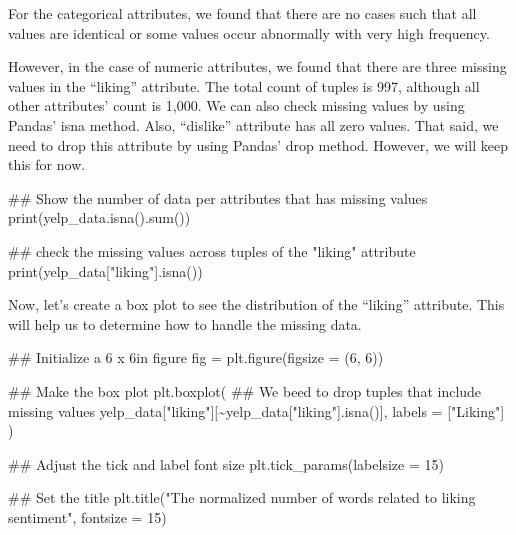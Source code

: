 \documentclass[
  letterpaper,
]{scrbook}
\newenvironment{Shaded}{\begin{snugshade}}{\end{snugshade}}
\newcommand{\BuiltInTok}[1]{\textcolor[rgb]{0.00,0.23,0.31}{#1}}
\newcommand{\CommentTok}[1]{\textcolor[rgb]{0.37,0.37,0.37}{#1}}
\newcommand{\DecValTok}[1]{\textcolor[rgb]{0.68,0.00,0.00}{#1}}
\newcommand{\NormalTok}[1]{\textcolor[rgb]{0.00,0.23,0.31}{#1}}
\newcommand{\OperatorTok}[1]{\textcolor[rgb]{0.37,0.37,0.37}{#1}}
\newcommand{\StringTok}[1]{\textcolor[rgb]{0.13,0.47,0.30}{#1}}
\begin{document}
For the categorical attributes, we found that there are no cases such
that all values are identical or some values occur abnormally with very
high frequency.

However, in the case of numeric attributes, we found that there are
three missing values in the ``liking'' attribute. The total count of
tuples is 997, although all other attributes' count is 1,000. We can
also check missing values by using Pandas' isna method. Also,
``dislike'' attribute has all zero values. That said, we need to drop
this attribute by using Pandas' drop method. However, we will keep this
for now.

\begin{Shaded}
\begin{Highlighting}[]
\CommentTok{\#\# Show the number of data per attributes that has missing values}
\BuiltInTok{print}\NormalTok{(yelp\_data.isna().}\BuiltInTok{sum}\NormalTok{())}
\end{Highlighting}
\end{Shaded}

\begin{Shaded}
\begin{Highlighting}[]
\CommentTok{\#\# check the missing values across tuples of the "liking" attribute}
\BuiltInTok{print}\NormalTok{(yelp\_data[}\StringTok{"liking"}\NormalTok{].isna())}
\end{Highlighting}
\end{Shaded}

Now, let's create a box plot to see the distribution of the ``liking''
attribute. This will help us to determine how to handle the missing
data.

\begin{Shaded}
\begin{Highlighting}[]
\CommentTok{\#\# Initialize a 6 x 6in figure}
\NormalTok{fig }\OperatorTok{=}\NormalTok{ plt.figure(figsize }\OperatorTok{=}\NormalTok{ (}\DecValTok{6}\NormalTok{, }\DecValTok{6}\NormalTok{))}

\CommentTok{\#\# Make the box plot}
\NormalTok{plt.boxplot(}
    \CommentTok{\#\# We beed to drop tuples that include missing values}
\NormalTok{    yelp\_data[}\StringTok{"liking"}\NormalTok{][}\OperatorTok{\textasciitilde{}}\NormalTok{yelp\_data[}\StringTok{"liking"}\NormalTok{].isna()], labels }\OperatorTok{=}\NormalTok{ [}\StringTok{"Liking"}\NormalTok{]}
\NormalTok{)}

\CommentTok{\#\# Adjust the tick and label font size}
\NormalTok{plt.tick\_params(labelsize }\OperatorTok{=} \DecValTok{15}\NormalTok{)}

\CommentTok{\#\# Set the title}
\NormalTok{plt.title(}\StringTok{"The normalized number of words related to \textquotesingle{}liking\textquotesingle{} sentiment"}\NormalTok{, fontsize }\OperatorTok{=} \DecValTok{15}\NormalTok{)}
\end{Highlighting}
\end{Shaded}
\end{document}
